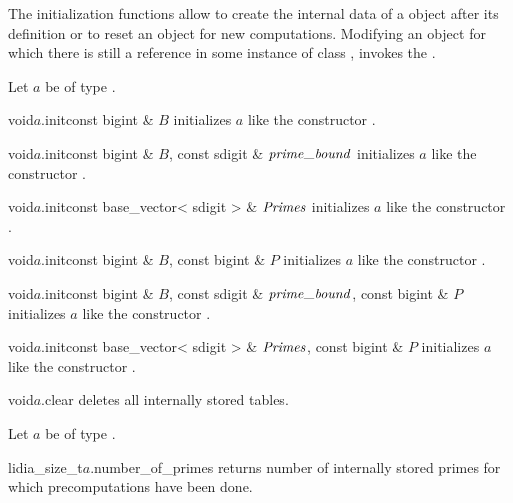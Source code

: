 \INIT

The initialization functions allow to create the internal data of a  object
after its definition or to reset an object for new computations.  Modifying an object for which
there is still a reference in some instance of class , invokes the \LEH.

Let $a$ be of type .

\begin{fcode}{void}{$a$.init}{const bigint & $B$}
  initializes $a$ like the constructor .
\end{fcode}

\begin{fcode}{void}{$a$.init}{const bigint & $B$, const sdigit & $\primebound$}
  initializes $a$ like the constructor .
\end{fcode}

\begin{fcode}{void}{$a$.init}{const base_vector< sdigit > & $\mathit{Primes}$}
  initializes $a$ like the constructor .
\end{fcode}

\begin{fcode}{void}{$a$.init}{const bigint & $B$, const bigint & $P$}
  initializes $a$ like the constructor .
\end{fcode}

\begin{fcode}{void}{$a$.init}{const bigint & $B$, const sdigit & $\primebound$, const bigint & $P$}
  initializes $a$ like the constructor .
\end{fcode}

\begin{fcode}{void}{$a$.init}{const base_vector< sdigit > & $\mathit{Primes}$, const bigint & $P$}
  initializes $a$ like the constructor .
\end{fcode}

\begin{fcode}{void}{$a$.clear}{}
  deletes all internally stored tables.
\end{fcode}



\ACCS

Let $a$ be of type .

\begin{cfcode}{lidia_size_t}{$a$.number_of_primes}{}
  returns number of internally stored primes for which precomputations have been done.
\end{cfcode}


